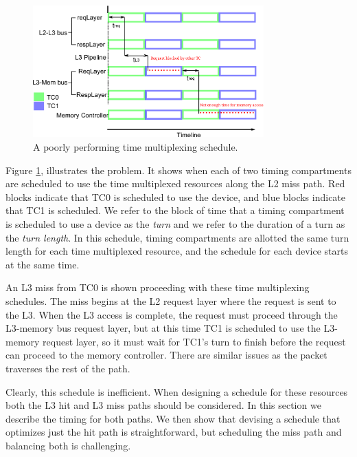 \begin{figure}
    \begin{center}
        \includegraphics[width=3.5in]{figs/problem.pdf}
        \caption{A poorly performing time multiplexing schedule.}
        \label{fig:problem}
    \end{center}
\end{figure}

Figure \ref{fig:problem}, illustrates the problem. It shows when each of two 
timing compartments are scheduled to use the time multiplexed resources along 
the L2 miss path. Red blocks indicate that TC0 is scheduled to use the device, 
and blue blocks indicate that TC1 is scheduled. We refer to the block of time 
that a timing compartment is scheduled to use a device as the \emph{turn} and 
we refer to the duration of a turn as the \emph{turn length}. In this schedule, 
timing compartments are allotted the same turn length for each time multiplexed 
resource, and the schedule for each device starts at the same time.

An L3 miss from TC0 is shown proceeding with these time multiplexing schedules.
The miss begins at the L2 request layer where the request is sent to the L3.  
When the L3 access is complete, the request must proceed through the L3-memory 
bus request layer, but at this time TC1 is scheduled to use the L3-memory 
request layer, so it must wait for TC1's turn to finish before the request can 
proceed to the memory controller. There are similar issues as the packet 
traverses the rest of the path.

Clearly, this schedule is inefficient. When designing a schedule for these 
resources both the L3 hit and L3 miss paths should be considered. In this 
section we describe the timing for both paths. We then show that devising a 
schedule that optimizes just the hit path is straightforward, but scheduling 
the miss path and balancing both is challenging.

